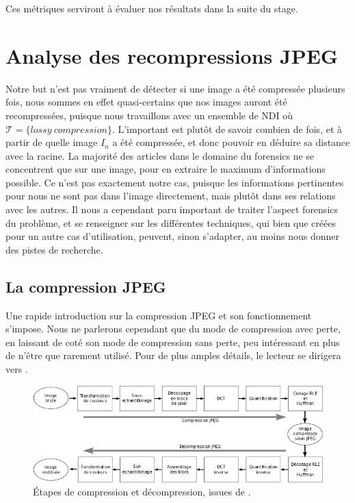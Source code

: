 \documentclass[utf8,final]{stageM2R} %
\begin{document}
Ces métriques serviront à évaluer nos résultats dans la suite du stage.

\section{Analyse des recompressions JPEG}
\label{detail_jpeg}
Notre but n'est pas vraiment de détecter si une image a été compressée plusieurs fois, nous sommes en effet quasi-certains que nos images auront été recompressées, puisque nous travaillons avec un ensemble de NDI où $\mathcal{T} = {\{lossy\ compression\}}$. L'important est plutôt de savoir combien de fois, et à partir de quelle image $I_{n}$ a été compressée, et donc pouvoir en déduire sa distance avec la racine. La majorité des articles dans le domaine du forensics ne se concentrent que sur une image, pour en extraire le maximum d'informations possible. Ce n'est pas exactement notre cas, puisque les informations pertinentes pour nous ne sont pas dans l'image directement, mais plutôt dans ses relations avec les autres. Il nous a cependant paru important de traiter l'aspect forensics du problème, et se renseigner sur les différentes techniques, qui bien que créées pour un autre cas d'utilisation, peuvent, sinon s'adapter, au moins nous donner des pistes de recherche.

\subsection{La compression JPEG}
Une rapide introduction sur la compression JPEG et son fonctionnement s'impose. Nous ne parlerons cependant que du mode de compression avec perte, en laissant de coté son mode de compression sans perte, peu intéressant en plus de n'être que rarement utilisé. Pour de plus amples détails, le lecteur se dirigera vers \autocite{wallace1992jpeg}.

\begin{figure}[H]
  \begin{center}
    \includegraphics[width=120mm]{images/jpeg.png}
    \caption{Étapes de compression et décompression, issues de \autocite{jpeg}.}
    \label{fig:jpeg}
  \end{center}
\end{figure}
\end{document}
